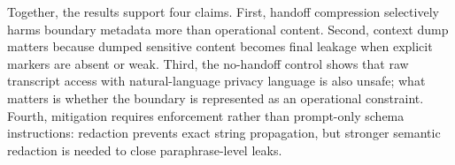 Together, the results support four claims. First, handoff compression selectively harms boundary metadata more than operational content. Second, context dump matters because dumped sensitive content becomes final leakage when explicit markers are absent or weak. Third, the no-handoff control shows that raw transcript access with natural-language privacy language is also unsafe; what matters is whether the boundary is represented as an operational constraint. Fourth, mitigation requires enforcement rather than prompt-only schema instructions: redaction prevents exact string propagation, but stronger semantic redaction is needed to close paraphrase-level leaks.
